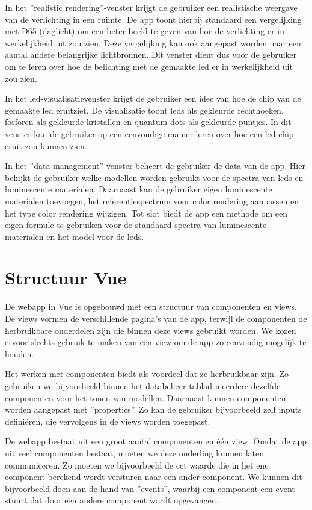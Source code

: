 In het ''realistic rendering''-venster krijgt de gebruiker een realistische weergave van de verlichting in een ruimte. De app toont hierbij standaard een vergelijking met D65 (daglicht) om een beter beeld te geven van hoe de verlichting er in werkelijkheid uit zou zien. Deze vergelijking kan ook aangepast worden naar een aantal andere belangrijke lichtbronnen. Dit venster dient dus voor de gebruiker om te leren over hoe de belichting met de gemaakte \gls{led} er in werkelijkheid uit zou zien.

In het led-visualisatievenster krijgt de gebruiker een idee van hoe de chip van de gemaakte \gls{led} eruitziet. De visualisatie toont \gls{led}s als gekleurde rechthoeken, fosforen als gekleurde kristallen en quantum dots als gekleurde puntjes. In dit venster kan de gebruiker op een eenvoudige manier leren over hoe een \gls{led} chip eruit zou kunnen zien. 

In het ''data management''-venster beheert de gebruiker de data van de app. Hier bekijkt de gebruiker welke modellen worden gebruikt voor de spectra van \gls{led}s en luminescente materialen. Daarnaast kan de gebruiker eigen luminescente materialen toevoegen, het referentiespectrum voor color rendering aanpassen en het type color rendering wijzigen. Tot slot biedt de app een methode om een eigen formule te gebruiken voor de standaard spectra van luminescente materialen en het model voor de \gls{led}s.

\section{Structuur Vue}

De webapp in Vue is opgebouwd met een structuur van componenten en views. De views vormen de verschillende pagina's van de app, terwijl de componenten de herbruikbare onderdelen zijn die binnen deze views gebruikt worden. We kozen ervoor slechts gebruik te maken van \"e\"en view om de app zo eenvoudig mogelijk te houden.

Het werken met componenten biedt als voordeel dat ze herbruikbaar zijn. Zo gebruiken we bijvoorbeeld binnen het databeheer tablad meerdere dezelfde componenten voor het tonen van modellen. Daarnaast kunnen componenten worden aangepast met ''properties''. Zo kan de gebruiker bijvoorbeeld zelf inputs defini\"eren, die vervolgens in de views worden toegepast.

De webapp bestaat uit een groot aantal componenten en \'e\'en view. Omdat de app uit veel componenten bestaat, moeten we deze onderling kunnen laten communiceren. Zo moeten we bijvoorbeeld de \gls{cct} waarde die in het ene component berekend wordt versturen naar een ander component. We kunnen dit bijvoorbeeld doen aan de hand van ''events'', waarbij een component een event stuurt dat door een andere component wordt opgevangen. 

